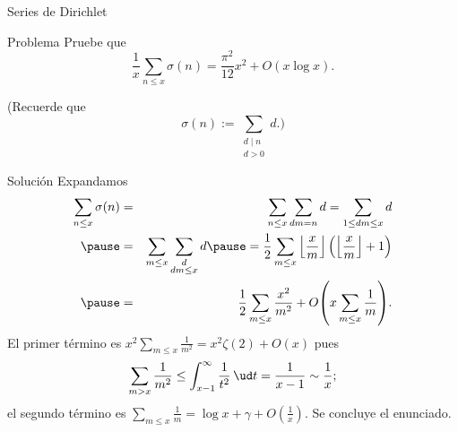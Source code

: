 \documentclass[handout, 10pt]{beamer}
\begin{document}
\begin{frame}{Series de Dirichlet}
	\begin{block}{Problema}
		Pruebe que
		\[
			\frac{1}{x} \sum_{n\le x} \sigma(n) = \frac{\pi^2}{12}x^2 + O(x\log x).
		\]
	\end{block}
	(Recuerde que
	\[
		\sigma(n) := \sum_{\substack{d\mid n \\ d > 0}} d.)
	\]
\end{frame}
\begin{frame}[fragile]{Solución}
	Expandamos
	\begin{eqnarray*}
		\sum_{n\le x} \sigma(n)
		&=& \sum_{n\le x} \sum_{dm = n} d = \sum_{1 \le dm \le x} d \\
		\pause
		  &=& \sum_{m \le x} \sum_{\substack{d \\ dm \le x}} d
		 \pause
		 = \frac{1}{2} \sum_{m\le x} \left\lfloor \frac{x}{m} \right\rfloor \left( \left\lfloor \frac{x}{m} \right\rfloor + 1
		 \right) \\
		 \pause
		  &=& \frac{1}{2} \sum_{m\le x} \frac{x^2}{m^2} + O\mathopen{}\left( x \sum_{m\le x} \frac{1}{m} \right)\mathclose{}.
	\end{eqnarray*}
	\pause
	El primer término es $x^2 \sum_{m\le x} \frac{1}{m^2} = x^2 \zeta(2) + O(x)$
	\pause
	pues
	\[
		\sum_{m > x} \frac{1}{m^2} \le \int_{x-1}^{\infty} \frac{1}{t^2} \, \ud t = \frac{1}{x-1} \sim \frac{1}{x};
	\]
	\pause
	el segundo término es $\sum_{m\le x} \frac{1}{m} = \log x + \gamma + O(\frac{1}{x})$.
	Se concluye el enunciado.
\end{frame}
\end{document}
